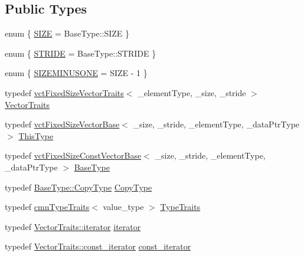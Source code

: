 \subsection*{Public Types}
\begin{DoxyCompactItemize}
\item 
enum \{ \hyperlink{classvct_fixed_size_vector_base_a688214b662551929a8d92e4ed7be0d42ae6389ee04e4be20faf1c7639de3202fb}{S\+I\+Z\+E} = Base\+Type\+:\+:S\+I\+Z\+E
 \}
\item 
enum \{ \hyperlink{classvct_fixed_size_vector_base_ace3f97f061ae60acb29f9719787d18a3a953b66e9631c2c4ff134062e7e09a37d}{S\+T\+R\+I\+D\+E} = Base\+Type\+:\+:S\+T\+R\+I\+D\+E
 \}
\item 
enum \{ \hyperlink{classvct_fixed_size_vector_base_a62a887358e152bf19a5f474546afa3c3acee84c36d2ff88a921ce7d01e86c4676}{S\+I\+Z\+E\+M\+I\+N\+U\+S\+O\+N\+E} = S\+I\+Z\+E -\/ 1
 \}
\item 
typedef \hyperlink{classvct_fixed_size_vector_traits}{vct\+Fixed\+Size\+Vector\+Traits}$<$ \+\_\+element\+Type, \+\_\+size, \+\_\+stride $>$ \hyperlink{classvct_fixed_size_vector_base_adacd2ddaf3408250dbcfc8fe5fecfd32}{Vector\+Traits}
\item 
typedef \hyperlink{classvct_fixed_size_vector_base}{vct\+Fixed\+Size\+Vector\+Base}$<$ \+\_\+size, \+\_\+stride, \+\_\+element\+Type, \+\_\+data\+Ptr\+Type $>$ \hyperlink{classvct_fixed_size_vector_base_a44798eb609f1e32d7fa8f1ac63d3f894}{This\+Type}
\item 
typedef \hyperlink{classvct_fixed_size_const_vector_base}{vct\+Fixed\+Size\+Const\+Vector\+Base}$<$ \+\_\+size, \+\_\+stride, \+\_\+element\+Type, \+\_\+data\+Ptr\+Type $>$ \hyperlink{classvct_fixed_size_vector_base_a91288c3a362ee7685859f42a9a3667c4}{Base\+Type}
\item 
typedef \hyperlink{classvct_fixed_size_const_vector_base_aaf3accb7cec5765478b5d8fa39c22408}{Base\+Type\+::\+Copy\+Type} \hyperlink{classvct_fixed_size_vector_base_a136da6f4bb90964f3f156533f85416d9}{Copy\+Type}
\item 
typedef \hyperlink{classcmn_type_traits}{cmn\+Type\+Traits}$<$ value\+\_\+type $>$ \hyperlink{classvct_fixed_size_vector_base_ad6d90437534a054c5beb020f588b0b02}{Type\+Traits}
\item 
typedef \hyperlink{classvct_fixed_size_vector_traits_a4c4cff693ac7f81edfb240a208506309}{Vector\+Traits\+::iterator} \hyperlink{classvct_fixed_size_vector_base_a541b35f08260e286587f4aa516a83d82}{iterator}
\item 
typedef \hyperlink{classvct_fixed_size_vector_traits_a9c7e38590e4a27350095e89a84dc0d09}{Vector\+Traits\+::const\+\_\+iterator} \hyperlink{classvct_fixed_size_vector_base_a178701dffe8173212039cd3edcb8697d}{const\+\_\+iterator}

\end{DoxyCompactItemize}
